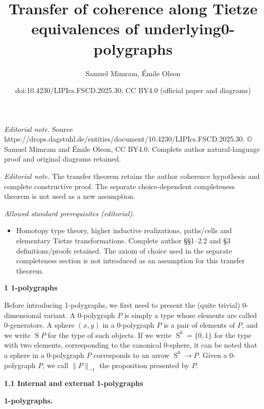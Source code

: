 \documentclass[10pt,a4paper]{amsart}
\title{Transfer of coherence along Tietze equivalences of underlying0-polygraphs}
\author{Samuel Mimram, Émile Oleon}
\date{doi:10.4230/LIPIcs.FSCD.2025.30; CC BY4.0 (official paper and diagrams)}
\begin{document}
\maketitle
\noindent\textit{Editorial note.} Source https://drops.dagstuhl.de/entities/document/10.4230/LIPIcs.FSCD.2025.30. © Samuel Mimram and Émile Oleon, CC BY4.0. Complete author natural-language proof and original diagrams retained.\par\medskip
\noindent\textit{Editorial note.} The transfer theorem retains the author coherence hypothesis and complete constructive proof. The separate choice-dependent completeness theorem is not used as a new assumption.\par\medskip
\noindent\textit{Allowed standard prerequisites (editorial).}\begin{itemize}
\item Homotopy type theory, higher inductive realizations, paths/cells and elementary Tietze transformations. Complete author §§1–2.2 and §3 definitions/proofs retained. The axiom of choice used in the separate completeness section is not introduced as an assumption for this transfer theorem.
\end{itemize}\medskip
 
\par\medskip\noindent\textbf{1 1-polygraphs}\par
 
 
Before introducing 1-polygraphs, we first need to present the (quite trivial) 0-dimensional variant. A 0-polygraph $P$ is simply a type whose elements are called $0$-generators. A sphere $(x,y)$ in a 0-polygraph $P$ is a pair of elements of $P$, and we write $\operatorname{S}P$ for the type of such objects. If we write $\operatorname{S}^{0}=\{0,1\}$ for the type with two elements, corresponding to the canonical 0-sphere, it can be noted that a sphere in a 0-polygraph $P$ corresponds to an arrow $\operatorname{S}^{0}\to P$. Given a $0$-polygraph $P$, we call $\|P\|_{-1}$ the proposition presented by $P$.\par
 
 
 
\par\medskip\noindent\textbf{1.1 Internal and external 1-polygraphs}\par
 
 
\par\medskip\noindent\textbf{1-polygraphs.}\par
 
\end{document}
